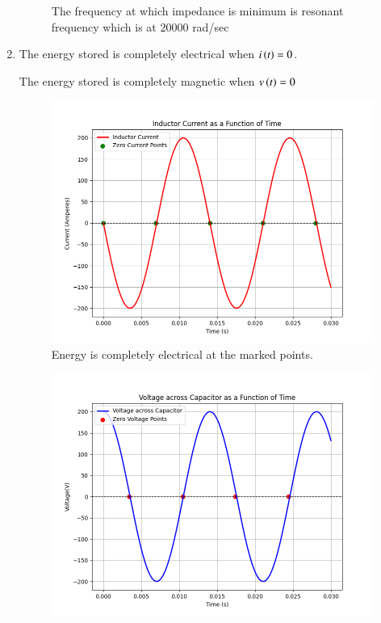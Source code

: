 \documentclass[journal,12pt,twocolumn]{IEEEtran}
\theoremstyle{remark}
\begin{document}
\begin{enumerate}[label=\textbf{(\alph*)}]
\begin{figure}[H]
    \caption{The frequency at which impedance is minimum is resonant frequency which is at $20000$ rad/sec}
    \label{fig:Z vs omega}
\end{figure}
\item 
The energy stored is completely electrical when $i\left(t\right)=0$.

The energy stored is completely magnetic when $v\left(t\right)=0$

\begin{figure}[H]
    \includegraphics[width=1\columnwidth]{figs/current_plot.png}
    \caption{Energy is completely electrical at the marked points. }
    \label{fig:current_plot}
\end{figure}
\begin{figure}[H]
    \includegraphics[width=1\columnwidth]{figs/voltage_plot.png}

\end{figure}
\end{enumerate}
\end{document}
